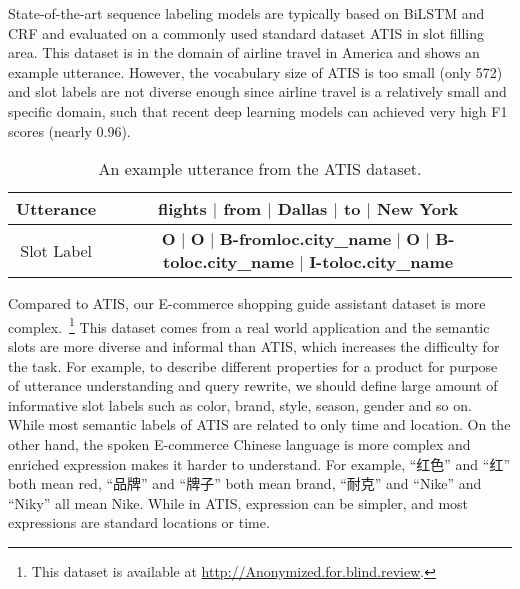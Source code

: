State-of-the-art sequence labeling models are typically based on 
BiLSTM and CRF \cite{huang2015bidirectional,reimers2017optimal}
and evaluated on a commonly used standard dataset ATIS \cite{price1990evaluation} in slot filling area.
This dataset is in the domain of airline travel in America and
 shows an example utterance.
However,
the vocabulary size of ATIS is too small (only 572)
and slot labels are not diverse enough
since airline travel is a relatively small and specific domain,
such that recent deep learning models can achieved very high F1 scores
(nearly 0.96).
\begin{table}[h]
	\centering
	\scriptsize
	\begin{tabular}{c|c}
		\toprule
		Utterance & flights $|$ from $|$ Dallas $|$ to $|$ New York \\
		\midrule
		Slot Label & \makecell{\textbf{O} $|$ \textbf{O} $|$ \textbf{B-fromloc.city\_name} $|$ \textbf{O} $|$ \textbf{B-toloc.city\_name} $|$ \\ \textbf{I-toloc.city\_name}}  \\
		\bottomrule
	\end{tabular}
	\caption{An example utterance from the ATIS dataset.}
	\label{tab:slot-filling-demo-atis}
	\vspace{-10pt}
\end{table}

Compared to ATIS, our E-commerce shopping guide assistant dataset is 
more complex.~\footnote{This dataset is available at \url{http://Anonymized.for.blind.review}.}
This dataset comes from a real world application and the
semantic slots are more diverse and informal than ATIS, 
which increases the difficulty for the task.
For example, to describe different properties for a product for purpose of utterance understanding and query rewrite,
we should define large amount of informative slot labels such as color, brand, style, season, gender and so on.
While most semantic labels of ATIS are related to only time and location.
On the other hand, the spoken E-commerce Chinese language is more complex and enriched expression makes it harder to understand.
For example, ``红色'' and ``红'' both mean red, ``品牌'' and ``牌子'' both mean brand, ``耐克'' and ``Nike'' and ``Niky'' all mean Nike.
While in ATIS, expression can be simpler, and most expressions are standard locations or time.

